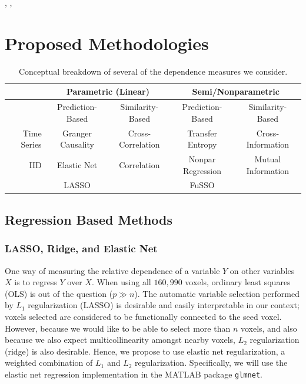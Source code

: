 \documentclass[11pt]{article}
\begin{document}
\cite{Craddock13predictingBrain},
\cite{Carroll09predictBrainDistributedSparse},
\cite{Ryali12stabilityElasticNet}
\section{Proposed Methodologies}

\begin{table}
\centering
\begin{tabular}{|r|c|c|c|c|}
\hline
            & \multicolumn{2}{|c|}{Parametric (Linear)} & \multicolumn{2}{|c|}{Semi/Nonparametric} \\ %
\hline
            & Prediction-Based                          & Similarity-Based  & Prediction-Based  & Similarity-Based      \\
\hline                                                                                                                  
Time Series & Granger Causality                         & Cross-Correlation & Transfer Entropy  & Cross-Information     \\
\hline                                                                                                                    
IID         & Elastic Net                               & Correlation       & Nonpar Regression & Mutual Information    \\
            & LASSO                                     &                   & FuSSO             &                       \\
\hline
\end{tabular}
\caption{Conceptual breakdown of several of the dependence measures we
consider.}
\label{tab:methods}
\end{table}

\subsection{Regression Based Methods}
\subsubsection{LASSO, Ridge, and Elastic Net}
One way of measuring the relative dependence of a variable $Y$ on other
variables $X$ is to regress $Y$ over $X$. When using all $160,990$ voxels,
ordinary least squares (OLS) is out of the question ($p \gg n$). The automatic
variable selection performed by $L_1$ regularization (LASSO) is desirable and
easily interpretable in our context; voxels selected are considered to be
functionally connected to the seed voxel. However, because we would like to be
able to select more than $n$ voxels, and also because we also expect
multicollinearity amongst nearby voxels, $L_2$ regularization (ridge) is also
desirable. Hence, we propose to use elastic net regularization, a weighted
combination of $L_1$ and $L_2$ regularization. Specifically, we will use the
elastic net regression implementation in the MATLAB package \texttt{glmnet}.
\end{document}
